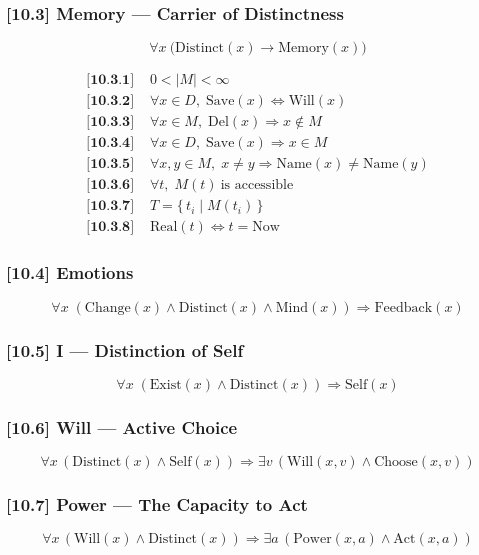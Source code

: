 \documentclass[12pt]{article}
\begin{document}
\subsubsection*{[10.3] Memory — Carrier of Distinctness}
\[
\forall x\ \big(\text{Distinct}(x) \rightarrow \text{Memory}(x)\big)
\]

\begin{align*}
\textbf{[10.3.1] } & 0 < |M| < \infty \\
\textbf{[10.3.2] } & \forall x \in D,\; \text{Save}(x) \Leftrightarrow \text{Will}(x) \\
\textbf{[10.3.3] } & \forall x \in M,\; \text{Del}(x) \Rightarrow x \notin M \\
\textbf{[10.3.4] } & \forall x \in D,\; \text{Save}(x) \Rightarrow x \in M \\
\textbf{[10.3.5] } & \forall x, y \in M,\; x \neq y \Rightarrow \text{Name}(x) \neq \text{Name}(y) \\
\textbf{[10.3.6] } & \forall t,\; M(t)\ \text{is accessible} \\
\textbf{[10.3.7] } & T = \{\, t_i \mid M(t_i) \,\} \\
\textbf{[10.3.8] } & \text{Real}(t) \Leftrightarrow t = \text{Now}
\end{align*}

\subsubsection*{[10.4] Emotions}
\[
\forall x \; (\text{Change}(x) \land \text{Distinct}(x) \land \text{Mind}(x)) \Rightarrow \text{Feedback}(x)
\]

\subsubsection*{[10.5] I — Distinction of Self}
\[
\forall x \; (\text{Exist}(x) \land \text{Distinct}(x)) \Rightarrow \text{Self}(x)
\]

\subsubsection*{[10.6] Will — Active Choice}
\[
\forall x\, (\text{Distinct}(x) \land \text{Self}(x)) \Rightarrow \exists v\, (\text{Will}(x, v) \land \text{Choose}(x, v))
\]

\subsubsection*{[10.7] Power — The Capacity to Act}
\[
\forall x\, (\text{Will}(x) \land \text{Distinct}(x)) \Rightarrow \exists a\, (\text{Power}(x, a) \land \text{Act}(x, a))
\]
\end{document}
